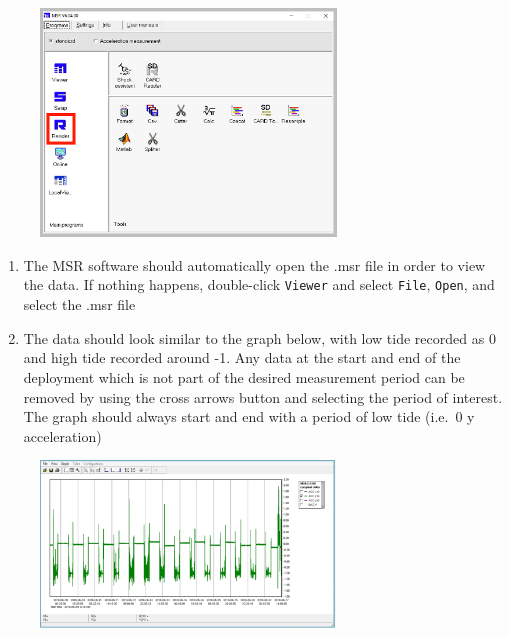 \documentclass[
  letterpaper,
  DIV=11,
  numbers=noendperiod]{scrreprt}
\providecommand{\tightlist}{%
  \setlength{\itemsep}{0pt}\setlength{\parskip}{0pt}}\usepackage{longtable,booktabs,array}
\begin{document}
\begin{figure}

{\centering \includegraphics[width=0.7\textwidth,height=\textheight]{chapters/figs/MSRExportStep3.png}

}

\end{figure}

\begin{enumerate}
\def\labelenumi{\arabic{enumi}.}
\setcounter{enumi}{4}
\tightlist
\item
  The MSR software should automatically open the .msr file in order to
  view the data. If nothing happens, double-click \texttt{Viewer} and
  select \texttt{File}, \texttt{Open}, and select the .msr file
\item
  The data should look similar to the graph below, with low tide
  recorded as 0 and high tide recorded around -1. Any data at the start
  and end of the deployment which is not part of the desired measurement
  period can be removed by using the cross arrows button and selecting
  the period of interest. The graph should always start and end with a
  period of low tide (i.e.~0 y acceleration)
\end{enumerate}

\begin{figure}

{\centering \includegraphics[width=0.7\textwidth,height=\textheight]{chapters/figs/MSRExportStep4.png}

}

\end{figure}
\end{document}
